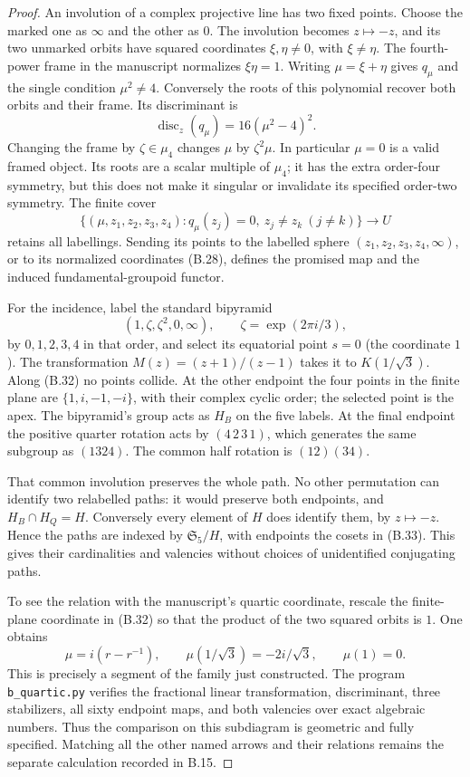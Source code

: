 \begin{proof}
An involution of a complex projective line has two fixed
points.  Choose the marked one as $\infty$ and the other as
$0$.  The involution becomes $z\mapsto-z$, and its two
unmarked orbits have squared coordinates $\xi,\eta\ne0$,
with $\xi\ne\eta$.  The fourth-power frame in the manuscript
normalizes $\xi\eta=1$.  Writing $\mu=\xi+\eta$ gives
$q_\mu$ and the single condition $\mu^2\ne4$.  Conversely
the roots of this polynomial recover both orbits and their
frame.  Its discriminant is
\[
 \operatorname{disc}_z(q_\mu)=16(\mu^2-4)^2.         \tag{B.34}
\]
Changing the frame by $\zeta\in\mu_4$ changes $\mu$ by
$\zeta^2\mu$.  In particular $\mu=0$ is a valid framed
object.  Its roots are a scalar multiple of $\mu_4$; it
has the extra order-four symmetry, but this does not make
it singular or invalidate its specified order-two symmetry.
The finite cover
\[
 \{(\mu,z_1,z_2,z_3,z_4):
     q_\mu(z_j)=0,\ z_j\ne z_k\ (j\ne k)\}
 \longrightarrow U
\]
retains all labellings.  Sending its points to the labelled
sphere $(z_1,z_2,z_3,z_4,\infty)$, or to its normalized
coordinates (B.28), defines the promised map and the induced
fundamental-groupoid functor.

For the incidence, label the standard bipyramid
\[
 (1,\zeta,\zeta^2,0,\infty),\qquad
 \zeta=\exp(2\pi i/3),
\]
by $0,1,2,3,4$ in that order, and select its equatorial
point $s=0$ (the coordinate $1$).  The transformation
$M(z)=(z+1)/(z-1)$ takes it to
$K(1/\sqrt3)$.  Along (B.32) no points collide.  At the
other endpoint the four points in the finite plane are
$\{1,i,-1,-i\}$, with their complex cyclic order; the
selected point is the apex.  The bipyramid's group acts
as $H_B$ on the five labels.  At the final endpoint the
positive quarter rotation acts by $(4\,2\,3\,1)$,
which generates the same subgroup as $(1324)$.
The common half rotation is $(12)(34)$.

That common involution preserves the whole path.  No other
permutation can identify two relabelled paths: it would
preserve both endpoints, and
$H_B\cap H_Q=H$.  Conversely every element of $H$ does
identify them, by $z\mapsto-z$.  Hence the paths are
indexed by $\mathfrak S_5/H$, with endpoints the cosets
in (B.33).  This gives their cardinalities and valencies
without choices of unidentified conjugating paths.

To see the relation with the manuscript's quartic
coordinate, rescale the finite-plane coordinate in (B.32)
so that the product of the two squared orbits is $1$.
One obtains
\[
 \mu=i(r-r^{-1}),\qquad
 \mu(1/\sqrt3)=-2i/\sqrt3,\qquad \mu(1)=0.
\]
This is precisely a segment of the family just constructed.
The program \texttt{b\_quartic.py} verifies the fractional
linear transformation, discriminant, three stabilizers,
all sixty endpoint maps, and both valencies over exact
algebraic numbers.  Thus the comparison on this subdiagram
is geometric and fully specified.  Matching all the other
named arrows and their relations remains the separate
calculation recorded in B.15.
\end{proof}
